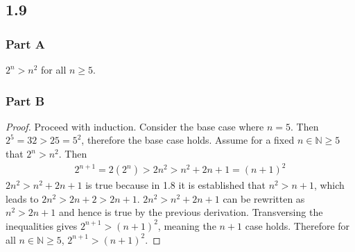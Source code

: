 \documentclass[12pt,titlepage]{extarticle}
\begin{document}
\subsection*{1.9}
\subsubsection*{Part A}
$2^n > n^2$ for all $n \geq 5$.

\subsubsection*{Part B}
\begin{proof}
	Proceed with induction. Consider the base case where $n = 5$. Then $2^5 = 32 > 25 = 5^2$, therefore the base case holds. Assume for a fixed $n \in \mathbb{N} \geq 5$ that $2^n > n^2$. Then
	\begin{align*}
		2^{n+1} = 2 (2^n) > 2n^2 > n^2 + 2n + 1 = (n+1)^2
	\end{align*}
	$2n^2 > n^2 + 2n + 1$ is true because in 1.8 it is established that $n^2 > n + 1$, which leads to $2n^2 > 2n + 2 > 2n + 1$. $2n^2 > n^2 + 2n + 1$ can be rewritten as $n^2 > 2n + 1$ and hence is true by the previous derivation. Transversing the inequalities gives $2^{n+1} > (n+1)^2$, meaning the $n+1$ case holds. Therefore for all $n \in \mathbb{N} \geq 5$, $2^{n+1} > (n+1)^2$.
\end{proof}
\end{document}
